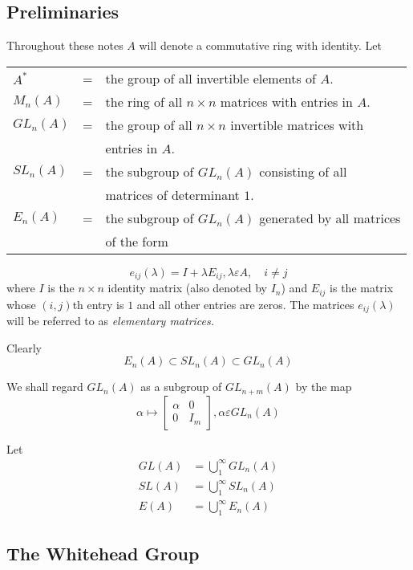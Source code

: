 \chapter{}\label{chap1}

\section{Preliminaries}\label{c1:s1}

Throughout these notes $A$ will denote a commutative ring with
identity. Let

\begin{tabular}{lll}
$A^{\ast}$ & =  &the group of all invertible elements of $A$.\\
$M_n(A)$ & = & the ring of all $n\times n$ matrices with entries in $A$.\\
$GL_n(A)$ &=& the group of all $n\times n$ invertible matrices with\\
& & entries in $A$. \\
$SL_n(A)$ & = &the subgroup of $GL_n(A)$ consisting of all\\ 
& & matrices of determinant $1$.\\
$E_n(A)$& = & the subgroup of $GL_n(A)$ generated by all matrices\\
& & of the form
\end{tabular}
$$
e_{ij}(\lambda)=I+\lambda E_{ij}, \lambda \varepsilon A,\quad i\neq j
$$
where $I$ is the $n\times n$ identity matrix (also denoted by $I_n$)
and $E_{ij}$ is the matrix whose $(i,j)$th  entry is $1$ and all other
entries are zeros. The matrices $e_{ij}(\lambda)$ will be referred to
as \textit{elementary matrices.}

Clearly
$$
E_n(A)\subset SL_n(A)\subset GL_n(A)
$$

We shall regard $GL_n(A)$ as a subgroup of $GL_{n+m}(A)$ by the map
$$
\alpha\mapsto \begin{bmatrix}
\alpha & 0\\
0 & I_m
\end{bmatrix}, \alpha \varepsilon GL_n(A)
$$

Let
\begin{align*}
GL(A)&=\bigcup\limits_{1}^{\infty} GL_n(A)\\
SL(A)&=\bigcup\limits_1^{\infty}SL_n(A)\\
E(A)&=\bigcup\limits_1^{\infty} E_n(A)
\end{align*}


\section{The Whitehead Group}\label{c1:s2}

